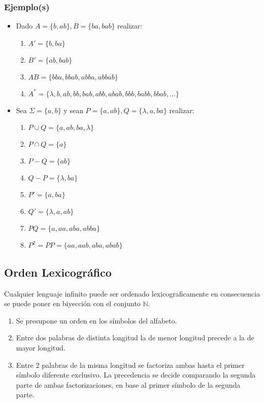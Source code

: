 \subsubsection{Ejemplo(s)}
\begin{itemize}
\item Dado $A =\{ b,ab \} , B=\{ ba, bab \}$ realizar:
\begin{enumerate}[label = \alph*)]
\item $A' = \{ b,ba \}$
\item $B' = \{ ab,bab \}$
\item $AB = \{ bba,bbab,abba,abbab \}$
\item $A^* = \{ \lambda,b,ab,bb,bab,abb,abab,bbb,babb,bbab,\ldots \}$
\end{enumerate}

\item Sea $\Sigma =\{ a,b \}$ y sean $P=\{a,ab\}, Q=\{ \lambda, a,ba \}$ realizar:
\begin{enumerate}[label = \alph*)]
\item $P\cup Q= \{ a,ab,ba,\lambda \}$
\item $P\cap Q= \{ a \}$
\item $P - Q  =\{ ab \} $
\item $Q - P  = \{ \lambda,ba \}$ 
\item $P' = \{ a,ba \}$
\item $Q' = \{ \lambda,a,ab \}$
\item $PQ = \{ a,aa,aba,abba \}$
\item $P^2=PP =\{ aa,aab,aba,abab \}$
\end{enumerate}
\end{itemize}
\subsection{Orden Lexicográfico}
Cualquier lenguaje infinito puede ser ordenado lexicograficamente en consecuencia se puede poner en biyección con el conjunto $\mathbb{N}$.
\begin{enumerate}
\item Se presupone un orden en los símbolos del alfabeto.
\item Entre dos palabras de distinta longitud la de menor longitud precede a la de mayor longitud.
\item Entre 2 palabras de la misma longitud se factoriza ambas hasta el primer símbolo diferente exclusivo. La precedencia se decide comparando la segunda parte de ambas factorizaciones, en base al primer símbolo de la segunda parte.
\end{enumerate}

